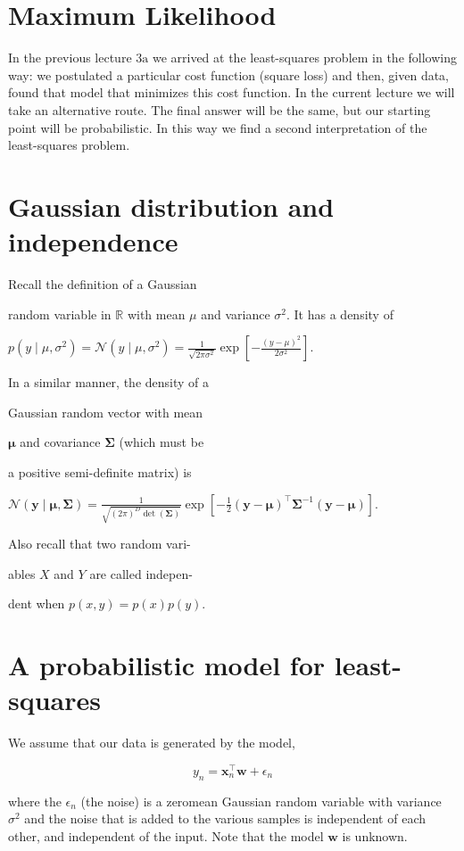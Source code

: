 \section*{Maximum Likelihood}
In the previous lecture $3 \mathrm{a}$ we arrived at the least-squares problem in the following way: we postulated a particular cost function (square loss) and then, given data, found that model that minimizes this cost function. In the current lecture we will take an alternative route. The final answer will be the same, but our starting point will be probabilistic. In this way we find a second interpretation of the least-squares problem.

\section*{Gaussian distribution and independence}
Recall the definition of a Gaussian

random variable in $\mathbb{R}$ with mean $\mu$ and variance $\sigma^{2}$. It has a density of

$p\left(y \mid \mu, \sigma^{2}\right)=\mathcal{N}\left(y \mid \mu, \sigma^{2}\right)=\frac{1}{\sqrt{2 \pi \sigma^{2}}} \exp \left[-\frac{(y-\mu)^{2}}{2 \sigma^{2}}\right]$.

In a similar manner, the density of a

Gaussian random vector with mean

$\boldsymbol{\mu}$ and covariance $\boldsymbol{\Sigma}$ (which must be

a positive semi-definite matrix) is

$\mathcal{N}(\mathbf{y} \mid \boldsymbol{\mu}, \boldsymbol{\Sigma})=\frac{1}{\sqrt{(2 \pi)^{D} \operatorname{det}(\boldsymbol{\Sigma})}} \exp \left[-\frac{1}{2}(\mathbf{y}-\boldsymbol{\mu})^{\top} \boldsymbol{\Sigma}^{-1}(\mathbf{y}-\boldsymbol{\mu})\right]$.

Also recall that two random vari-

ables $X$ and $Y$ are called indepen-

dent when $p(x, y)=p(x) p(y)$.

\section*{A probabilistic model for least-squares}
We assume that our data is generated by the model,

$$
y_{n}=\mathbf{x}_{n}^{\top} \mathbf{w}+\epsilon_{n}
$$

where the $\epsilon_{n}$ (the noise) is a zeromean Gaussian random variable with variance $\sigma^{2}$ and the noise that is added to the various samples is independent of each other, and independent of the input. Note that the model $\mathbf{w}$ is unknown.

